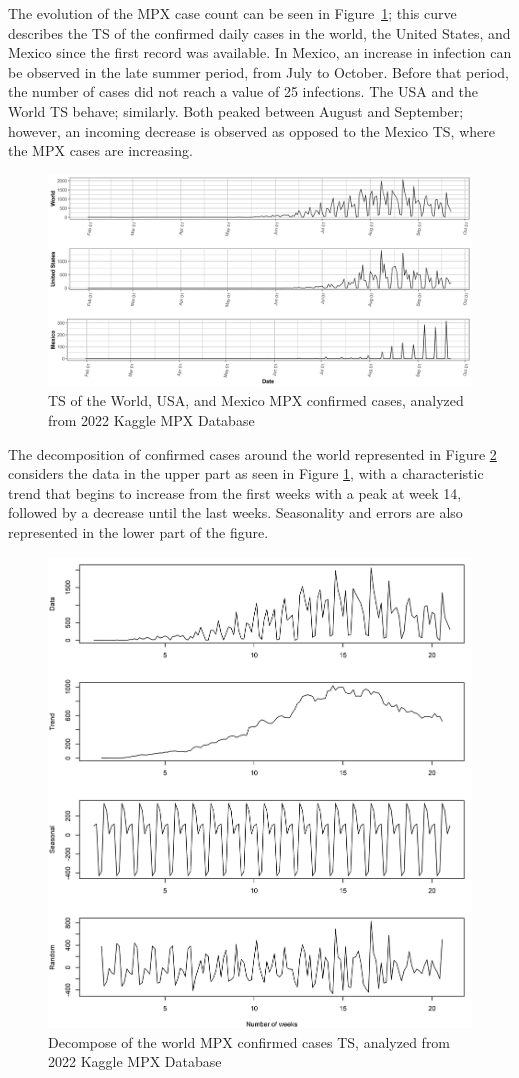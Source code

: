 \documentclass[conference]{IEEEtran}
\begin{document}
The evolution of the MPX case count can be seen in Figure~\ref{fig:MexicoTimeSeries}; this curve describes the TS of the confirmed daily cases in the world, the United States, and Mexico since the first record was available. In Mexico, an increase in infection can be observed in the late summer period, from July to October. Before that period, the number of cases did not reach a value of 25 infections. The USA and the World TS behave; similarly. Both peaked between August and September; however, an incoming decrease is observed as opposed to the Mexico TS, where the MPX cases are increasing.
\begin{figure}[H]
    \centering
    \includegraphics[width = 8 cm]{TimeSeries.png}
    \caption{TS of the World, USA, and Mexico MPX confirmed cases, analyzed from 2022 Kaggle MPX Database~\cite{Contractor2022}}
    \label{fig:MexicoTimeSeries}
\end{figure}

The decomposition of confirmed cases around the world represented in Figure \ref{fig:WorldDecompose} considers the data in the upper part as seen in Figure \ref{fig:MexicoTimeSeries}, with a characteristic trend that begins to increase from the first weeks with a peak at week 14, followed by a decrease until the last weeks. Seasonality and errors are also represented in the lower part of the figure.

\begin{figure}[H]
    \centering
    \includegraphics[width = 6 cm]{World_Decompose.png}
    \caption{Decompose of the world MPX confirmed cases TS, analyzed from 2022 Kaggle MPX Database~\cite{Contractor2022}}
    \label{fig:WorldDecompose}
\end{figure}
\end{document}
